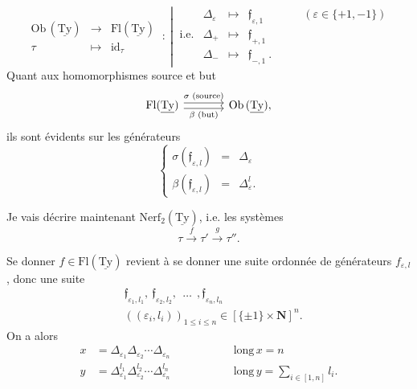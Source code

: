 \documentclass[11pt]{article}
\newcommand{\msp}[1]{\marginpar{\footnotesize [#1]}}
\newcommand{\uTy}{\underline{\mathrm{Ty}}}
\begin{document}
\[
\begin{array}{ccc}
\mathrm{Ob}\,(\uTy) & \longrightarrow & \mathrm{Fl}(\uTy)\\[4pt]
\tau & \longmapsto & \mathrm{id}_\tau
\end{array}
\ :\
\left|\
\begin{array}{rcccl}
 & \Delta_\varepsilon & \longmapsto & \mathfrak{f}_{\varepsilon,1} & \qquad(\varepsilon\in\{+1,-1\})\\[4pt]
\text{i.e.} & \Delta_+ & \longmapsto & \mathfrak{f}_{+,1} & \\[4pt]
 & \Delta_- & \longmapsto & \mathfrak{f}_{-,1}\ . &
\end{array}
\right.
\]
Quant aux homomorphismes source et but
\[
\begin{tikzcd}[column sep=large]
\mathrm{Fl}(\uTy) \arrow[r, shift left, "\sigma\text{ (source)}"] \arrow[r, shift right, "\beta\text{ (but)}"'] & \mathrm{Ob}\,(\uTy),
\end{tikzcd}
\]
ils sont évidents sur les générateurs
\[
\left\{
\begin{array}{lcl}
\sigma(\mathfrak{f}_{\varepsilon,l}) & = & \Delta_\varepsilon\\[4pt]
\beta(\mathfrak{f}_{\varepsilon,l}) & = & \Delta^l_\varepsilon.
\end{array}
\right.
\]

Je vais décrire maintenant $\mathrm{Nerf}_2(\uTy)$, i.e. les systèmes
\[
\tau \xrightarrow{\ f\ } \tau' \xrightarrow{\ g\ } \tau''.
\]

\msp{page 52}
Se donner $f\in\mathrm{Fl}(\uTy)$ revient à se donner une suite ordonnée de générateurs $f_{\varepsilon,l}$, donc une suite
\[
\begin{aligned}
&\mathfrak{f}_{\varepsilon_1,l_1},\ \mathfrak{f}_{\varepsilon_2,l_2},\ \ \dots\ \ ,\mathfrak{f}_{\varepsilon_n,l_n}\\
&((\varepsilon_i,l_i))_{1\leq i\leq n}\in[\{\pm1\}\times\mathbf{N}]^n.
\end{aligned}
\]
On a alors
\[
\begin{aligned}
x &= \Delta_{\varepsilon_1}\Delta_{\varepsilon_2}\cdots\Delta_{\varepsilon_n} &\qquad\qquad& \mathrm{long}\,x = n\\
y &= \Delta^{l_1}_{\varepsilon_1}\Delta^{l_2}_{\varepsilon_2}\cdots\Delta^{l_n}_{\varepsilon_n} && \mathrm{long}\,y = \textstyle\sum_{i\in[1,n]} l_i.
\end{aligned}
\]
\end{document}
